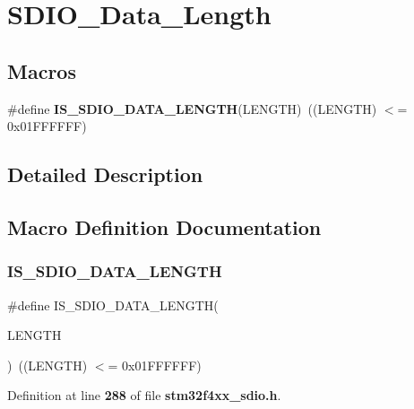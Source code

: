 \section{S\+D\+I\+O\+\_\+\+Data\+\_\+\+Length}
\label{group__SDIO__Data__Length}
\subsection*{Macros}
\begin{DoxyCompactItemize}
\item 
\#define \textbf{ I\+S\+\_\+\+S\+D\+I\+O\+\_\+\+D\+A\+T\+A\+\_\+\+L\+E\+N\+G\+TH}(L\+E\+N\+G\+TH)~((L\+E\+N\+G\+TH) $<$= 0x01\+F\+F\+F\+F\+F\+F)
\end{DoxyCompactItemize}


\subsection{Detailed Description}


\subsection{Macro Definition Documentation}
\mbox{\label{group__SDIO__Data__Length_ga57dd64db3f69d18625ea8ca82c009fad}} 
\subsubsection{I\+S\+\_\+\+S\+D\+I\+O\+\_\+\+D\+A\+T\+A\+\_\+\+L\+E\+N\+G\+TH}
{\footnotesize\ttfamily \#define I\+S\+\_\+\+S\+D\+I\+O\+\_\+\+D\+A\+T\+A\+\_\+\+L\+E\+N\+G\+TH(\begin{DoxyParamCaption}\item[{}]{L\+E\+N\+G\+TH }\end{DoxyParamCaption})~((L\+E\+N\+G\+TH) $<$= 0x01\+F\+F\+F\+F\+F\+F)}



Definition at line \textbf{ 288} of file \textbf{ stm32f4xx\+\_\+sdio.\+h}.

